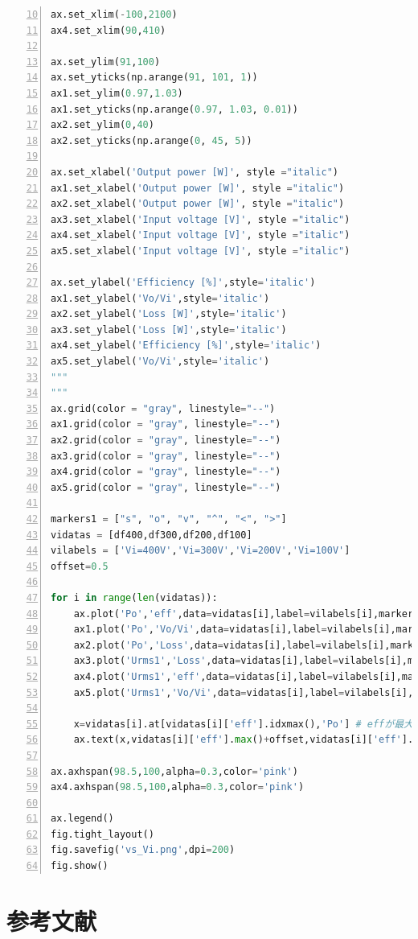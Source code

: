 \documentclass[
  10pt,
  a4paper,
  pandoc,
  titlepage]{ltjsarticle}
\begin{document}
\begin{codelisting}
\begin{lstlisting}[language=Python, numbers=left, firstnumber=10, caption={test.py}, label=lst:code1]
ax.set_xlim(-100,2100)
ax4.set_xlim(90,410)

ax.set_ylim(91,100)
ax.set_yticks(np.arange(91, 101, 1))
ax1.set_ylim(0.97,1.03)
ax1.set_yticks(np.arange(0.97, 1.03, 0.01))
ax2.set_ylim(0,40)
ax2.set_yticks(np.arange(0, 45, 5))

ax.set_xlabel('Output power [W]', style ="italic")
ax1.set_xlabel('Output power [W]', style ="italic")
ax2.set_xlabel('Output power [W]', style ="italic")
ax3.set_xlabel('Input voltage [V]', style ="italic")
ax4.set_xlabel('Input voltage [V]', style ="italic")
ax5.set_xlabel('Input voltage [V]', style ="italic")

ax.set_ylabel('Efficiency [%]',style='italic')
ax1.set_ylabel('Vo/Vi',style='italic')
ax2.set_ylabel('Loss [W]',style='italic')
ax3.set_ylabel('Loss [W]',style='italic')
ax4.set_ylabel('Efficiency [%]',style='italic')
ax5.set_ylabel('Vo/Vi',style='italic')
"""
"""
ax.grid(color = "gray", linestyle="--")
ax1.grid(color = "gray", linestyle="--")
ax2.grid(color = "gray", linestyle="--")
ax3.grid(color = "gray", linestyle="--")
ax4.grid(color = "gray", linestyle="--")
ax5.grid(color = "gray", linestyle="--")

markers1 = ["s", "o", "v", "^", "<", ">"]
vidatas = [df400,df300,df200,df100]
vilabels = ['Vi=400V','Vi=300V','Vi=200V','Vi=100V']
offset=0.5

for i in range(len(vidatas)):
    ax.plot('Po','eff',data=vidatas[i],label=vilabels[i],marker=markers1[i])
    ax1.plot('Po','Vo/Vi',data=vidatas[i],label=vilabels[i],marker=markers1[i])
    ax2.plot('Po','Loss',data=vidatas[i],label=vilabels[i],marker=markers1[i])
    ax3.plot('Urms1','Loss',data=vidatas[i],label=vilabels[i],marker=markers1[i])
    ax4.plot('Urms1','eff',data=vidatas[i],label=vilabels[i],marker=markers1[i])
    ax5.plot('Urms1','Vo/Vi',data=vidatas[i],label=vilabels[i],marker=markers1[i])

    x=vidatas[i].at[vidatas[i]['eff'].idxmax(),'Po'] # effが最大値を取るときのPo
    ax.text(x,vidatas[i]['eff'].max()+offset,vidatas[i]['eff'].max())

ax.axhspan(98.5,100,alpha=0.3,color='pink')
ax4.axhspan(98.5,100,alpha=0.3,color='pink')

ax.legend()
fig.tight_layout()
fig.savefig('vs_Vi.png',dpi=200)
fig.show()
\end{lstlisting}

\end{codelisting}

\hypertarget{ux53c2ux8003ux6587ux732e}{%
\section*{参考文献}\label{ux53c2ux8003ux6587ux732e}}
\end{document}
